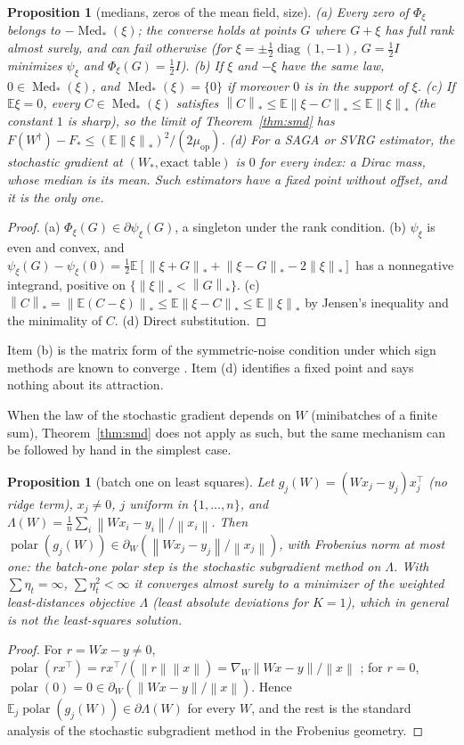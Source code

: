 \documentclass[11pt]{article}
\newtheorem{proposition}[theorem]{Proposition}
\theoremstyle{remark}
\newcommand{\E}{\mathbb{E}}
\newcommand{\norm}[1]{\left\|#1\right\|}
\newcommand{\nnuc}[1]{\left\|#1\right\|_{*}}
\newcommand{\diag}{\operatorname{diag}}
\newcommand{\polar}{\operatorname{polar}}
\newcommand{\Med}{\operatorname{Med}_\ast}
\newcommand{\muop}{\mu_{\mathrm{op}}}
\begin{document}
\begin{proposition}[medians, zeros of the mean field, size]\label{prop:median}
(a) Every zero of $\Phi_\xi$ belongs to $-\Med(\xi)$; the converse holds at points $G$ where $G+\xi$ has full rank
almost surely, and can fail otherwise (for $\xi=\pm\frac12\diag(1,-1)$, $G=\frac12I$ minimizes $\psi_\xi$ and
$\Phi_\xi(G)=\frac12I$).
(b) If $\xi$ and $-\xi$ have the same law, $0\in\Med(\xi)$, and $\Med(\xi)=\{0\}$ if moreover $0$ is in the support of
$\xi$.
(c) If $\E\xi=0$, every $C\in\Med(\xi)$ satisfies $\nnuc C\le\E\nnuc{\xi-C}\le\E\nnuc\xi$ (the constant $1$ is sharp), so
the limit of Theorem~\ref{thm:smd} has $F(W^\dagger)-F_\ast\le(\E\nnuc\xi)^2/(2\muop)$.
(d) For a SAGA or SVRG estimator, the stochastic gradient at $(W_\ast,\text{exact table})$ is $0$ for every index: a
Dirac mass, whose median is its mean. Such estimators have a fixed point without offset, and it is the only one.
\end{proposition}
\begin{proof}
(a) $\Phi_\xi(G)\in\partial\psi_\xi(G)$, a singleton under the rank condition. (b) $\psi_\xi$ is even and convex, and
$\psi_\xi(G)-\psi_\xi(0)=\frac12\E[\nnuc{\xi+G}+\nnuc{\xi-G}-2\nnuc\xi]$ has a nonnegative integrand, positive on
$\{\nnuc\xi<\nnuc G\}$. (c) $\nnuc C=\nnuc{\E(C-\xi)}\le\E\nnuc{\xi-C}\le\E\nnuc\xi$ by Jensen's inequality and the
minimality of $C$. (d) Direct substitution.
\end{proof}
Item (b) is the matrix form of the symmetric-noise condition under which sign methods are known to converge
\cite{bernstein2019majority,jacobs2026parallel}. Item (d) identifies a fixed point and says nothing about its
attraction.

When the law of the stochastic gradient depends on $W$ (minibatches of a finite sum), Theorem~\ref{thm:smd} does not
apply as such, but the same mechanism can be followed by hand in the simplest case.

\begin{proposition}[batch one on least squares]\label{prop:lad}
Let $g_j(W)=(Wx_j-y_j)x_j^\top$ (no ridge term), $x_j\ne0$, $j$ uniform in $\{1,\dots,n\}$, and
$\Lambda(W)=\frac1n\sum_i\norm{Wx_i-y_i}/\norm{x_i}$. Then $\polar(g_j(W))\in\partial_W(\norm{Wx_j-y_j}/\norm{x_j})$, with
Frobenius norm at most one: the batch-one polar step is the stochastic subgradient method on $\Lambda$. With
$\sum\eta_t=\infty$, $\sum\eta_t^2<\infty$ it converges almost surely to a minimizer of the weighted least-distances
objective $\Lambda$ (least absolute deviations for $K=1$), which in general is not the least-squares solution.
\end{proposition}
\begin{proof}
For $r=Wx-y\ne0$, $\polar(rx^\top)=rx^\top/(\norm r\norm x)=\nabla_W\norm{Wx-y}/\norm x$
\cite[Lemma~H.1]{li2026implicit}; for $r=0$, $\polar(0)=0\in\partial_W(\norm{Wx-y}/\norm x)$. Hence
$\E_j\polar(g_j(W))\in\partial\Lambda(W)$ for every $W$, and the rest is the standard analysis of the stochastic
subgradient method in the Frobenius geometry.
\end{proof}
\end{document}
